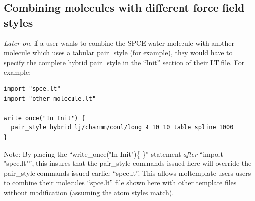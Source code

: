 \documentclass[11pt]{article}
\begin{document}





\subsection{Combining molecules with different force field styles}
\label{sec:overriding_styles}
\textit{Later on}, if a user wants to combine the SPCE water molecule
with another molecule which uses a tabular pair\_style (for example), 
they would have to specify the complete hybrid pair\_style in the 
``Init'' section of their LT file.  For example:
\begin{verbatim}
import "spce.lt"
import "other_molecule.lt"

write_once("In Init") {
  pair_style hybrid lj/charmm/coul/long 9 10 10 table spline 1000
}
\end{verbatim}
Note: By placing the ``write\_once("In Init")\{ \}'' statement 
\textit{after} ``import "spce.lt"'', this insures that
the pair\_style commands issued here will override the 
pair\_style commands issued earlier ``spce.lt''.
This allows moltemplate users users to combine their molecules
``spce.lt'' file shown here
with other template files without modification
(assuming the atom styles match).
\end{document}
